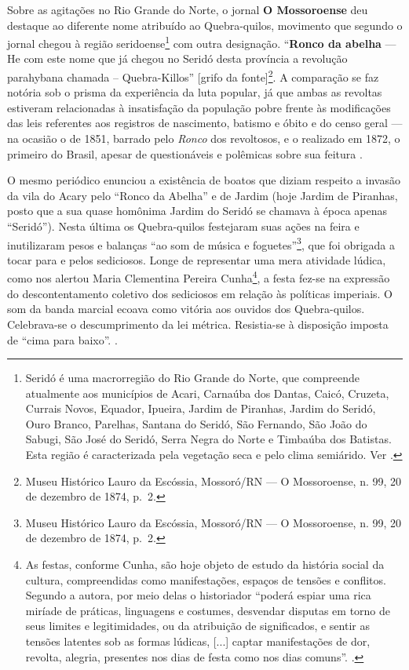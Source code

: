 \begin{refsection}
Sobre as agitações no Rio Grande do Norte, o jornal \textbf{O Mossoroense} deu destaque ao diferente nome atribuído ao Quebra-quilos, movimento que segundo o jornal chegou à região seridoense\footnote{Seridó é uma macrorregião do Rio Grande do Norte, que compreende atualmente aos municípios de Acari, Carnaúba dos Dantas, Caicó, Cruzeta, Currais Novos, Equador, Ipueira, Jardim de Piranhas, Jardim do Seridó, Ouro Branco, Parelhas, Santana do Seridó, São Fernando, São João do Sabugi, São José do Seridó, Serra Negra do Norte e Timbaúba dos Batistas. Esta região é caracterizada pela vegetação seca e pelo clima semiárido. Ver \cite{Abrantes2011}.} com outra designação. “\textbf{Ronco da abelha} --- He com este nome que já chegou no Seridó desta província a revolução parahybana chamada – Quebra-Killos” [grifo da fonte]\footnote{Museu Histórico Lauro da Escóssia, Mossoró/RN --- O Mossoroense, n. 99, 20 de dezembro de 1874, p.~2.}. A comparação se faz notória sob o prisma da experiência da luta popular, já que ambas as revoltas estiveram relacionadas à insatisfação da população pobre frente às modificações das leis referentes aos registros de nascimento, batismo e óbito e do censo geral --- na ocasião o de 1851, barrado pelo \textit{Ronco} dos revoltosos, e o realizado em 1872, o primeiro do Brasil, apesar de questionáveis e polêmicas sobre sua feitura \cite{Oliveira2005}.

O mesmo periódico enunciou a existência de boatos que diziam respeito a invasão da vila do Acary pelo “Ronco da Abelha” e de Jardim (hoje Jardim de Piranhas, posto que a sua quase homônima Jardim do Seridó se chamava à época apenas “Seridó”). Nesta última os Quebra-quilos festejaram suas ações na feira e inutilizaram pesos e balanças “ao som de música e foguetes”\footnote{Museu Histórico Lauro da Escóssia, Mossoró/RN --- O Mossoroense, n. 99, 20 de dezembro de 1874, p.~2.}, que foi obrigada a tocar para e pelos sediciosos. Longe de representar uma mera atividade lúdica, como nos alertou Maria Clementina Pereira Cunha\footnote{As festas, conforme Cunha, são hoje objeto de estudo da história social da cultura, compreendidas como manifestações, espaços de tensões e conflitos. Segundo a autora, por meio delas o historiador “poderá espiar uma rica miríade de práticas, linguagens e costumes, desvendar disputas em torno de seus limites e legitimidades, ou da atribuição de significados, e sentir as tensões latentes sob as formas lúdicas, [...] captar manifestações de dor, revolta, alegria, presentes nos dias de festa como nos dias comuns”. \cite[p.~12]{Cunha2002}.}, a festa fez-se na expressão do descontentamento coletivo dos sediciosos em relação às políticas imperiais. O som da banda marcial ecoava como vitória aos ouvidos dos Quebra-quilos. Celebrava-se o descumprimento da lei métrica. Resistia-se à disposição imposta de “cima para baixo”. \cite[p.~13]{Cunha2002}.


\end{refsection}

